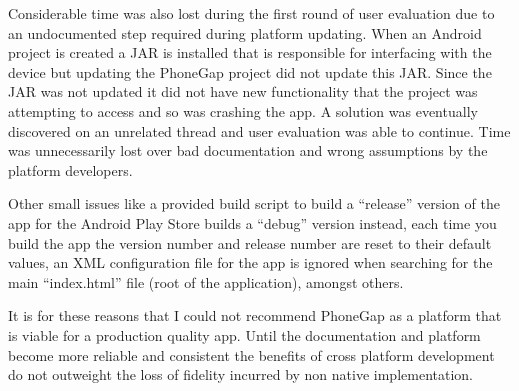 Considerable time was also lost during the first round of user
evaluation due to an undocumented step required during platform
updating. When an Android project is created a JAR is installed that
is responsible for interfacing with the device but updating the
PhoneGap project did not update this JAR. Since the JAR was not
updated it did not have new functionality that the project was
attempting to access and so was crashing the app. A solution was
eventually discovered on an unrelated thread\cite{pluginFix} and user
evaluation was able to continue. Time was unnecessarily lost over bad
documentation and wrong assumptions by the platform developers.

Other small issues like a provided build script to build a ``release''
version of the app for the Android Play Store builds a ``debug''
version instead, each time you build the app the version number and
release number are reset to their default values, an XML configuration
file for the app is ignored when searching for the main ``index.html''
file (root of the application), amongst others.

It is for these reasons that I could not recommend PhoneGap as a
platform that is viable for a production quality app. Until the
documentation and platform become more reliable and consistent the
benefits of cross platform development do not outweight the loss of
fidelity incurred by non native implementation.
